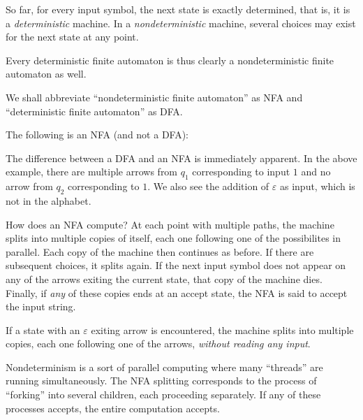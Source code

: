 So far, for every input symbol, the next state is exactly determined, that is, it is a \textit{deterministic} machine. In a \textit{nondeterministic} machine, several choices may exist for the next state at any point.

Every deterministic finite automaton is thus clearly a nondeterministic finite automaton as well.

We shall abbreviate ``nondeterministic finite automaton'' as NFA and ``deterministic finite automaton'' as DFA.

\begin{example}
The following is an NFA (and not a DFA):
\begin{center}
\end{center}
\end{example}

The difference between a DFA and an NFA is immediately apparent. In the above example, there are multiple arrows from $q_1$ corresponding to input $1$ and no arrow from $q_2$ corresponding to $1$. We also see the addition of $\varepsilon$ as input, which is not in the alphabet.

\vspace{2mm}
How does an NFA compute? At each point with multiple paths, the machine splits into multiple copies of itself, each one following one of the possibilites in parallel. Each copy of the machine then continues as before. If there are subsequent choices, it splits again. If the next input symbol does not appear on any of the arrows exiting the current state, that copy of the machine dies. Finally, if \textit{any} of these copies ends at an accept state, the NFA is said to accept the input string.

If a state with an $\varepsilon$ exiting arrow is encountered, the machine splits into multiple copies, each one following one of the arrows, \textit{without reading any input}.

\vspace{3mm}
Nondeterminism is a sort of parallel computing where many ``threads'' are running simultaneously. The NFA splitting corresponds to the process of ``forking'' into several children, each proceeding separately. If any of these processes accepts, the entire computation accepts.

